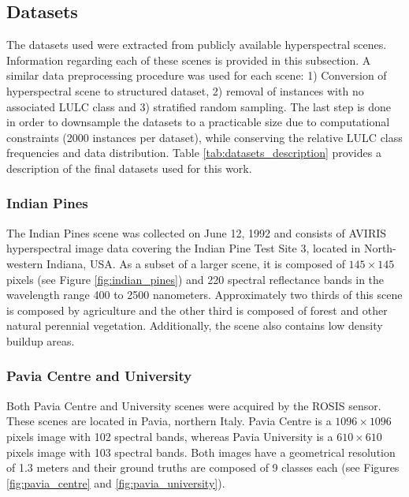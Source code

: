 \documentclass[parskip=full]{scrartcl}
\begin{document}
\subsection{Datasets}

The datasets used were extracted from publicly available hyperspectral scenes.
Information regarding each of these scenes is provided in this subsection. A
similar data preprocessing procedure was used for each scene: 1) Conversion of
hyperspectral scene to structured dataset, 2) removal of instances with no
associated LULC class and 3) stratified random sampling. The last step is done
in order to downsample the datasets to a practicable size due to computational
constraints (2000 instances per dataset), while conserving the relative LULC
class frequencies and data distribution. Table \ref{tab:datasets_description} provides
a description of the final datasets used for this work.


\subsubsection*{Indian Pines}
The Indian Pines scene \cite{Baumgardner2015} was collected on June 12, 1992
and consists of AVIRIS hyperspectral image data covering the Indian Pine Test
Site 3, located in North-western Indiana, USA. As a subset of a larger scene,
it is composed of $145 \times 145$ pixels (see Figure
\ref{fig:indian_pines}) and 220 spectral reflectance bands in the wavelength
range 400 to 2500 nanometers. Approximately two thirds of this scene is
composed by agriculture and the other third is composed of forest and other
natural perennial vegetation. Additionally, the scene also contains low density
buildup areas.

\subsubsection*{Pavia Centre and University}
Both Pavia Centre and University scenes were acquired by the ROSIS sensor.
These scenes are located in Pavia, northern Italy. Pavia Centre is a
$1096 \times 1096$ pixels image with 102 spectral bands, whereas Pavia
University is a $610 \times 610$ pixels image with 103 spectral bands.
Both images have a geometrical resolution of 1.3 meters and their ground truths
are composed of 9 classes each (see Figures \ref{fig:pavia_centre} and
\ref{fig:pavia_university}).
\end{document}
